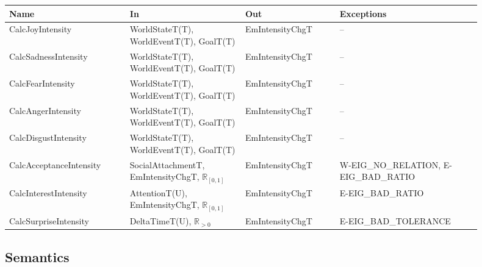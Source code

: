 \begin{center}
    \renewcommand{\arraystretch}{1.1}
    \begin{tabular}{m{0.23\linewidth} m{0.22\linewidth} m{0.18\linewidth}
    m{0.27\linewidth}}
        \toprule
        \textbf{Name} & \textbf{In} & \textbf{Out} & \textbf{Exceptions} \\
        \midrule

        \rowcolor[gray]{0.9}CalcJoyIntensity & WorldStateT(T), WorldEventT(T),
        GoalT(T) & EmIntensityChgT & -- \\

        CalcSadnessIntensity & WorldStateT(T), WorldEventT(T), GoalT(T) &
        EmIntensityChgT & -- \\

        \rowcolor[gray]{0.9}CalcFearIntensity & WorldStateT(T), WorldEventT(T),
        GoalT(T) & EmIntensityChgT & -- \\

        CalcAngerIntensity & WorldStateT(T), WorldEventT(T), GoalT(T) &
        EmIntensityChgT & -- \\

        \rowcolor[gray]{0.9}CalcDisgustIntensity & WorldStateT(T),
        WorldEventT(T), GoalT(T) & EmIntensityChgT & -- \\

        CalcAcceptanceIntensity & SocialAttachmentT, \newline
        EmIntensityChgT, $\mathbb{R}_{[0, 1]}$ & EmIntensityChgT &
        W-EIG\_NO\_RELATION, \newline E-EIG\_BAD\_RATIO \\

        \rowcolor[gray]{0.9}CalcInterestIntensity & AttentionT(U), \newline
        EmIntensityChgT, $\mathbb{R}_{[0, 1]}$ & EmIntensityChgT &
        E-EIG\_BAD\_RATIO \\

        CalcSurpriseIntensity & DeltaTimeT(U), $\mathbb{R}_{>0}$ &
        EmIntensityChgT & E-EIG\_BAD\_TOLERANCE \\

        \bottomrule
    \end{tabular}
\end{center}

\subsection{Semantics}

